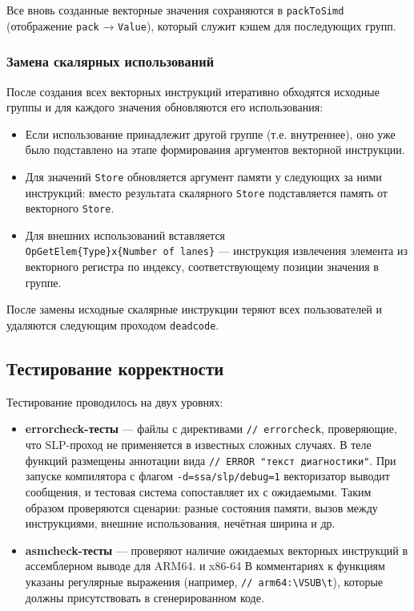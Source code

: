 Все вновь созданные векторные значения сохраняются в \texttt{packToSimd} (отображение \texttt{pack} → \texttt{Value}), который служит кэшем для последующих групп.

\subsubsection{Замена скалярных использований}

После создания всех векторных инструкций итеративно обходятся исходные группы и для каждого значения обновляются его использования:

\begin{itemize}
    \item Если использование принадлежит другой группе (т.е. внутреннее), оно уже было подставлено на этапе формирования аргументов векторной инструкции.
    \item Для значений \texttt{Store} обновляется аргумент памяти у следующих за ними инструкций: вместо результата скалярного \texttt{Store} подставляется память от векторного \texttt{Store}.
    \item Для внешних использований вставляется \texttt{OpGetElem\{Type\}x\{Number\ of\ lanes\}} --- инструкция извлечения элемента из векторного регистра по индексу, соответствующему позиции значения в группе.
\end{itemize}

После замены исходные скалярные инструкции теряют всех пользователей и удаляются следующим проходом \texttt{deadcode}.

\subsection{Тестирование корректности}
\label{sec:testing}

Тестирование проводилось на двух уровнях:

\begin{itemize}
    \item \textbf{errorcheck-тесты} --- файлы с директивами \texttt{// errorcheck}, 
    проверяющие, что SLP-проход не применяется в известных сложных случаях. В теле функций размещены аннотации вида \texttt{// ERROR "текст диагностики"}. 
    При запуске компилятора с флагом \texttt{-d=ssa/slp/debug=1} векторизатор выводит сообщения, и тестовая система сопоставляет их с ожидаемыми. 
    Таким образом проверяются сценарии: разные состояния памяти, вызов между инструкциями, внешние использования, нечётная ширина и др.
    
    \item \textbf{asmcheck-тесты} --- проверяют наличие ожидаемых векторных инструкций в ассемблерном выводе для ARM64. и x86-64 
    В комментариях к функциям указаны регулярные выражения (например, \texttt{// arm64:\textbackslash VSUB\textbackslash t}), которые должны присутствовать
    в сгенерированном коде.
\end{itemize}

